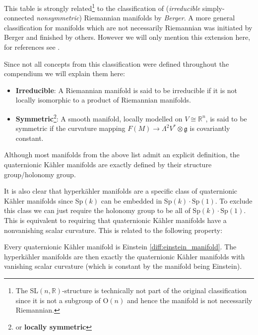     \begin{remark*}
        This table is strongly related\footnote{The SL$(n, \mathbb{R})$-structure is technically not part of the original classification since it is not a subgroup of O$(n)$ and hence the manifold is not necessarily Riemannian.} to the classification of (\textit{irreducible} simply-connected \textit{nonsymmetric}) Riemannian manifolds by \textit{Berger}. A more general classification for manifolds which are not necessarily Riemannian was initiated by Berger and finished by others. However we will only mention this extension here, for references see \cite{diffgeom_physics}.

        Since not all concepts from this classification were defined throughout the compendium we will explain them here:
        \begin{itemize}
            \item \textbf{Irreducible}: A Riemannian manifold is said to be irreducible if it is not locally isomorphic to a product of Riemannian manifolds.
            \item \textbf{Symmetric}\footnote{or \textbf{locally symmetric}}: A smooth manifold, locally modelled on $V\cong\mathbb{R}^n$, is said to be symmetric if the curvature mapping $F(M)\rightarrow\Lambda^2V^*\otimes\mathfrak{g}$ is covariantly constant.
        \end{itemize}
    \end{remark*}

    \begin{remark}
        Although most manifolds from the above list admit an explicit definition, the quaternionic K\"ahler manifolds are exactly defined by their structure group/holonomy group.

        It is also clear that hyperk\"ahler manifolds are a specific class of quaternionic K\"ahler manifolds since Sp$(k)$ can be embedded in Sp$(k)\cdot\text{Sp}(1)$. To exclude this class we can just require the holonomy group to be all of Sp$(k)\cdot\text{Sp}(1)$. This is equivalent to requiring that quaternionic K\"ahler manifolds have a nonvanishing scalar curvature. This is related to the following property:
    \end{remark}
    \begin{property}
        Every quaternionic K\"ahler manifold is Einstein \ref{diff:einstein_manifold}. The hyperk\"ahler manifolds are then exactly the quaternionic K\"ahler manifolds with vanishing scalar curvature (which is constant by the manifold being Einstein).
    \end{property}